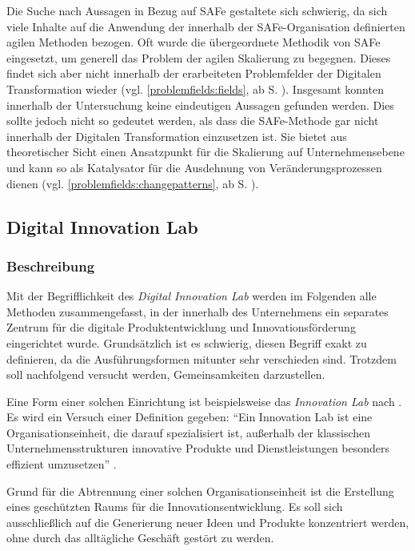 Die Suche nach Aussagen in Bezug auf SAFe gestaltete sich schwierig, da sich viele Inhalte auf die Anwendung der innerhalb der SAFe-Organisation definierten agilen Methoden bezogen. Oft wurde die übergeordnete Methodik von SAFe eingesetzt, um generell das Problem der agilen Skalierung zu begegnen. Dieses findet sich aber nicht innerhalb der erarbeiteten Problemfelder der Digitalen Transformation wieder (vgl. \ref{problemfields:fields}, ab S. \pageref{problemfields:fields}). Insgesamt konnten innerhalb der Untersuchung keine eindeutigen Aussagen gefunden werden. Dies sollte jedoch nicht so gedeutet werden, als dass die SAFe-Methode gar nicht innerhalb der Digitalen Transformation  einzusetzen ist. Sie bietet aus theoretischer Sicht einen Ansatzpunkt für die Skalierung auf Unternehmensebene und kann so als Katalysator für die Ausdehnung von Veränderungsprozessen dienen (vgl. \ref{problemfields:changepatterns}, ab S. \pageref{problemfields:changepatterns}).

\subsection{Digital Innovation Lab}

\subsubsection{Beschreibung}

Mit der Begrifflichkeit des \textit{Digital Innovation Lab} werden im Folgenden alle Methoden zusammengefasst, in der innerhalb des Unternehmens ein separates Zentrum für die digitale Produktentwicklung und Innovationsförderung eingerichtet wurde. Grundsätzlich ist es schwierig, diesen Begriff exakt zu definieren, da die Ausführungsformen mitunter sehr verschieden sind. Trotzdem soll nachfolgend versucht werden, Gemeinsamkeiten darzustellen.

Eine Form einer solchen Einrichtung ist beispielsweise das \textit{Innovation Lab} nach . Es wird ein Versuch einer Definition gegeben: ``Ein Innovation Lab ist eine Organisationseinheit, die darauf spezialisiert ist, außerhalb der klassischen Unternehmensstrukturen innovative Produkte und Dienstleistungen besonders effizient umzusetzen'' \cite{meyer_innovation_nodate}.

Grund für die Abtrennung einer solchen Organisationseinheit ist die Erstellung eines geschützten Raums für die Innovationsentwicklung. Es soll sich ausschließlich auf die Generierung neuer Ideen und Produkte konzentriert werden, ohne durch das alltägliche Geschäft gestört zu werden.

